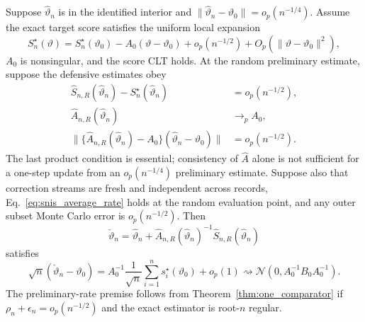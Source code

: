 \begin{theorem}
\label{thm:defensive_one_step}
Suppose $\widehat\vartheta_n$ is in the identified interior and
$\|\widehat\vartheta_n-\vartheta_0\|=o_p(n^{-1/4})$.  Assume the exact target
score satisfies the uniform local expansion
\begin{equation}
 S_n^\star(\vartheta)
 =S_n^\star(\vartheta_0)-A_0(\vartheta-\vartheta_0)
 +o_p(n^{-1/2})+O_p(\|\vartheta-\vartheta_0\|^2),
 \label{eq:exact_score_local_expansion}
\end{equation}
$A_0$ is nonsingular, and the score CLT holds.  At the random preliminary
estimate, suppose the defensive estimates obey
\begin{align}
 \widehat S_{n,R}(\widehat\vartheta_n)
  -S_n^\star(\widehat\vartheta_n)&=o_p(n^{-1/2}),
 \label{eq:defensive_score_accuracy}\\
 \widehat A_{n,R}(\widehat\vartheta_n)&\to_p A_0,
 \label{eq:defensive_info_consistency}\\
 \|\{\widehat A_{n,R}(\widehat\vartheta_n)-A_0\}
 (\widehat\vartheta_n-\vartheta_0)\|&=o_p(n^{-1/2}).
 \label{eq:critical_information_product}
\end{align}
The last product condition is essential; consistency of $\widehat A$ alone is
not sufficient for a one-step update from an $o_p(n^{-1/4})$ preliminary
estimate.  Suppose also that correction streams are fresh and independent
across records, Eq.~\eqref{eq:snis_average_rate} holds at the random evaluation
point, and any outer subset Monte Carlo error is $o_p(n^{-1/2})$.  Then
\begin{equation}
 \check\vartheta_n
 =\widehat\vartheta_n
  +\widehat A_{n,R}(\widehat\vartheta_n)^{-1}
   \widehat S_{n,R}(\widehat\vartheta_n)
 \label{eq:defensive_one_step_update}
\end{equation}
satisfies
\[
 \sqrt n(\check\vartheta_n-\vartheta_0)
 =A_0^{-1}\frac1{\sqrt n}\sum_{i=1}^n
 s_i^\star(\vartheta_0)+o_p(1)
 \rightsquigarrow\mathcal N(0,A_0^{-1}B_0A_0^{-1}).
\]
The preliminary-rate premise follows from
Theorem~\ref{thm:one_comparator} if
$\rho_n+\epsilon_n=o_p(n^{-1/2})$ and the exact estimator is root-$n$
regular.
\end{theorem}

